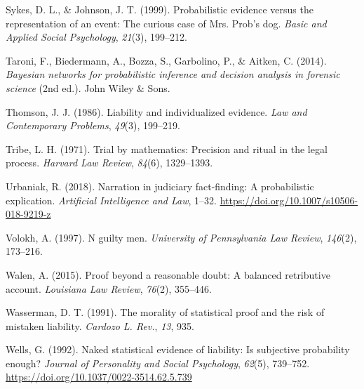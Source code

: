 \documentclass[10pt,dvipsnames,enabledeprecatedfontcommands]{scrartcl}
\begin{document}
\leavevmode\hypertarget{ref-sykes1999}{}%
Sykes, D. L., \& Johnson, J. T. (1999). Probabilistic evidence versus
the representation of an event: The curious case of Mrs. Prob's dog.
\emph{Basic and Applied Social Psychology}, \emph{21}(3), 199--212.

\leavevmode\hypertarget{ref-taroni2006bayesian}{}%
Taroni, F., Biedermann, A., Bozza, S., Garbolino, P., \& Aitken, C.
(2014). \emph{Bayesian networks for probabilistic inference and decision
analysis in forensic science} (2nd ed.). John Wiley \& Sons.

\leavevmode\hypertarget{ref-thomson1986liability}{}%
Thomson, J. J. (1986). Liability and individualized evidence. \emph{Law
and Contemporary Problems}, \emph{49}(3), 199--219.

\leavevmode\hypertarget{ref-tribe1971trial}{}%
Tribe, L. H. (1971). Trial by mathematics: Precision and ritual in the
legal process. \emph{Harvard Law Review}, \emph{84}(6), 1329--1393.

\leavevmode\hypertarget{ref-urbaniak2018narration}{}%
Urbaniak, R. (2018). Narration in judiciary fact-finding: A
probabilistic explication. \emph{Artificial Intelligence and Law},
1--32. \url{https://doi.org/10.1007/s10506-018-9219-z}

\leavevmode\hypertarget{ref-voloch1997}{}%
Volokh, A. (1997). N guilty men. \emph{University of Pennsylvania Law
Review}, \emph{146}(2), 173--216.

\leavevmode\hypertarget{ref-walen2015}{}%
Walen, A. (2015). Proof beyond a reasonable doubt: A balanced
retributive account. \emph{Louisiana Law Review}, \emph{76}(2),
355--446.

\leavevmode\hypertarget{ref-wasserman1991morality}{}%
Wasserman, D. T. (1991). The morality of statistical proof and the risk
of mistaken liability. \emph{Cardozo L. Rev.}, \emph{13}, 935.

\leavevmode\hypertarget{ref-wells1992naked}{}%
Wells, G. (1992). Naked statistical evidence of liability: Is subjective
probability enough? \emph{Journal of Personality and Social Psychology},
\emph{62}(5), 739--752. \url{https://doi.org/10.1037/0022-3514.62.5.739}
\end{document}
